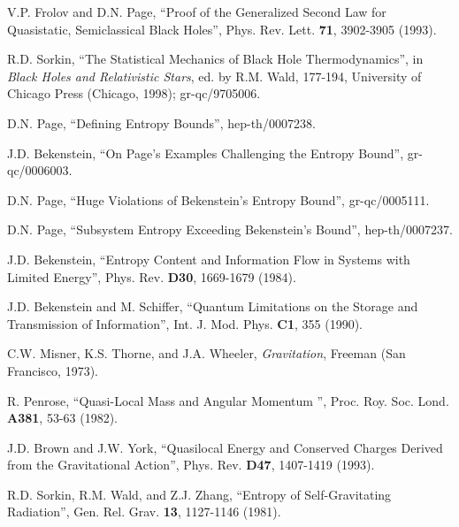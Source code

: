 \begin{thebibliography}{999}
 V.P. Frolov and D.N. Page, ``Proof of
the Generalized Second Law for Quasistatic, Semiclassical Black
Holes'', Phys. Rev. Lett. {\bf 71}, 3902-3905 (1993).

 R.D. Sorkin, ``The Statistical Mechanics
of Black Hole Thermodynamics'', in {\it Black Holes and Relativistic
Stars}, ed. by R.M. Wald, 177-194, University of Chicago Press
(Chicago, 1998); gr-qc/9705006.  

 D.N. Page, ``Defining Entropy
Bounds'', hep-th/0007238.

 J.D. Bekenstein, ``On Page's Examples
Challenging the Entropy Bound'', gr-qc/0006003.

 D.N. Page, ``Huge Violations of
Bekenstein's Entropy Bound'', gr-qc/0005111.

 D.N. Page, ``Subsystem Entropy Exceeding Bekenstein's Bound'', hep-th/0007237.

 J.D. Bekenstein, ``Entropy Content and
Information Flow in Systems with Limited Energy'', Phys. Rev. {\bf
D30}, 1669-1679 (1984).  

 J.D. Bekenstein and M. Schiffer,
``Quantum Limitations on the Storage and Transmission of
Information'', Int. J. Mod. Phys. {\bf C1}, 355 (1990).

 C.W. Misner, K.S. Thorne, and J.A. Wheeler,
{\it Gravitation}, Freeman (San Francisco, 1973).

 R. Penrose, ``Quasi-Local Mass and
Angular Momentum '', Proc. Roy. Soc. Lond. {\bf A381}, 53-63 (1982).

 J.D. Brown and J.W. York, ``Quasilocal
Energy and Conserved Charges Derived from the Gravitational Action'',
Phys. Rev. {\bf D47}, 1407-1419 (1993).  

 R.D. Sorkin, R.M. Wald, and Z.J. Zhang,
``Entropy of Self-Gravitating Radiation'', Gen. Rel. Grav. {\bf 13},
1127-1146 (1981).  


\end{thebibliography}
